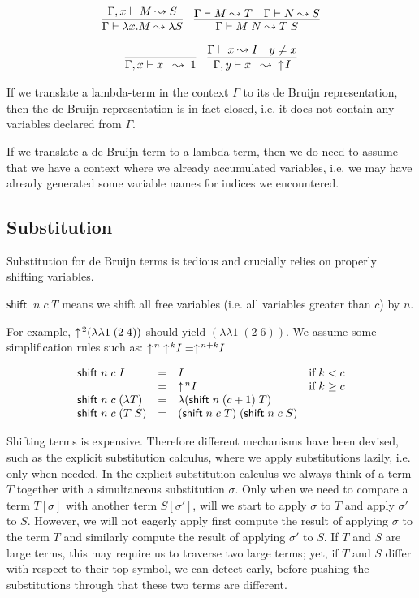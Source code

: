 \[
\begin{array}{c}
\infer{\Gamma \vdash \lambda x. M \leadsto \lambda S}{\Gamma,x \vdash M
\leadsto S} \quad
\infer{\Gamma \vdash M\;N \leadsto T\;S}{
\Gamma \vdash M \leadsto T
  & 
\Gamma \vdash N \leadsto S}
\\[1em]
\infer{\Gamma,x \vdash x \;\;\leadsto \;1}{} \quad
\infer{\Gamma, y \vdash x\;\; \leadsto\;\; \shift I}{\Gamma \vdash x \leadsto
  I \quad y \neq x}
\end{array}
\]

If we translate a lambda-term in the context $\Gamma$ to its de Bruijn
representation, then the de Bruijn representation is in fact closed,
i.e. it does not contain any variables declared from $\Gamma$.

If we translate a de Bruijn term to a lambda-term, then we do need to
assume that we have a context where we already accumulated variables,
i.e. we may have already generated some variable names for indices we
encountered. 

\subsection*{Substitution} Substitution for de Bruijn terms is tedious
and crucially relies on properly shifting variables.

\newcommand{\shiftby}{\textsf{shift}\;}

$\shiftby\;n\;c\;T$ means we shift all free variables (i.e. all
variables greater than $c$) by $n$.

For example, $\uparrow\!^2 (\lambda \lambda 1\;(2\;4))$ should yield
$(\lambda \lambda 1\;(2\;6))$. We assume some simplification rules
such as: $\uparrow\!^n \uparrow\!^k I = \uparrow\! ^{n+k} I$

\[
\begin{array}{lcll}
\shiftby n \;c \; I & = & I  & \mbox{if}\; k < c \\
                   & =  & \shift^n I &\mbox{if}\; k \geq c \\
\shiftby n\;c \; (\lambda T) & = & \lambda (\shiftby n\;(c+1)\;T)\\
\shiftby n\;c\; (T\;S)       & = & (\shiftby n \;c\; T)\;(\shiftby n \;c\;S)
\end{array}
\]


Shifting terms is expensive. Therefore different mechanisms have
been devised, such as the explicit substitution calculus, where we
apply substitutions lazily, i.e. only when needed. In the explicit
substitution calculus we always think of a term $T$ together with a
simultaneous substitution $\sigma$. Only when we need to compare a term
$T[\sigma]$ with another term $S[\sigma']$, will we start to apply
$\sigma$ to $T$ and  apply $\sigma'$ to $S$. However, we will not
eagerly apply first compute the result of applying $\sigma$ to the
term $T$ and similarly compute the result of applying $\sigma'$ to
$S$. If $T$ and $S$ are large terms, this may require us to traverse
two large terms; yet, if $T$ and $S$ differ with respect to their top
symbol, we can detect early, before pushing the substitutions through
that these two terms are different. 



